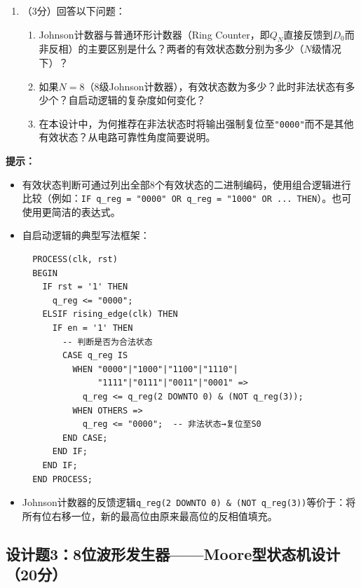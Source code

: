 \begin{enumerate}[label=(\arabic*)]
\begin{itemize}
    \item 代码中包含详细的中文注释，解释自启动逻辑的设计思路。
  \end{itemize}
  \item （3分）回答以下问题：
  \begin{enumerate}
    \item Johnson计数器与普通环形计数器（Ring Counter，即$Q_N$直接反馈到$D_0$而非反相）的主要区别是什么？两者的有效状态数分别为多少（$N$级情况下）？
    \item 如果$N=8$（8级Johnson计数器），有效状态数为多少？此时非法状态有多少个？自启动逻辑的复杂度如何变化？
    \item 在本设计中，为何推荐在非法状态时将输出强制复位至\texttt{"0000"}而不是其他有效状态？从电路可靠性角度简要说明。
  \end{enumerate}
\end{enumerate}

\begin{framed}
\textbf{提示：}
\begin{itemize}
  \item 有效状态判断可通过列出全部8个有效状态的二进制编码，使用组合逻辑进行比较（例如：\texttt{IF q\_reg = "0000" OR q\_reg = "1000" OR ... THEN}）。也可使用更简洁的表达式。
  \item 自启动逻辑的典型写法框架：
  \begin{verbatim}
  PROCESS(clk, rst)
  BEGIN
    IF rst = '1' THEN
      q_reg <= "0000";
    ELSIF rising_edge(clk) THEN
      IF en = '1' THEN
        -- 判断是否为合法状态
        CASE q_reg IS
          WHEN "0000"|"1000"|"1100"|"1110"|
               "1111"|"0111"|"0011"|"0001" =>
            q_reg <= q_reg(2 DOWNTO 0) & (NOT q_reg(3));
          WHEN OTHERS =>
            q_reg <= "0000";  -- 非法状态→复位至S0
        END CASE;
      END IF;
    END IF;
  END PROCESS;
  \end{verbatim}
  \item Johnson计数器的反馈逻辑\texttt{q\_reg(2 DOWNTO 0) \& (NOT q\_reg(3))}等价于：将所有位右移一位，新的最高位由原来最高位的反相值填充。
\end{itemize}
\end{framed}

\newpage

\subsection*{设计题3：8位波形发生器——Moore型状态机设计（20分）}

